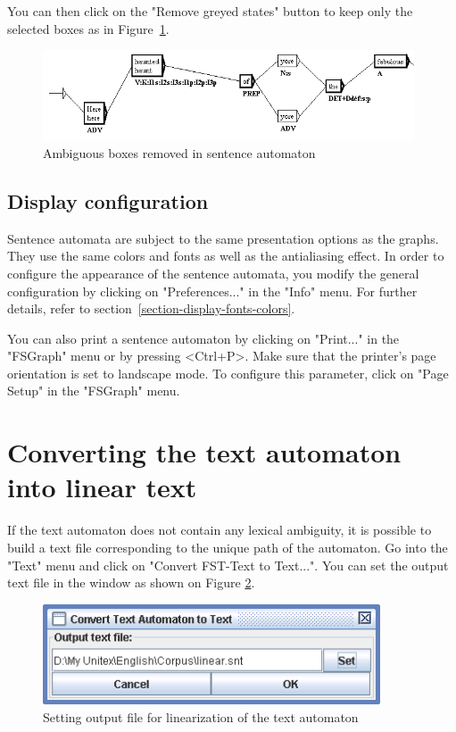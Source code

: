 \bigskip
\noindent You can then click on the "Remove greyed states" button to keep only the selected boxes as in Figure~\ref{fig-removed-ambiguities}.
\begin{figure}[!ht]
\begin{center}
\includegraphics[width=11cm]{resources/img/fig7-24c.png}
\caption{Ambiguous boxes removed in sentence automaton\label{fig-removed-ambiguities}}
\end{center}
\end{figure}

\bigskip
\noindent 
\subsection{Display configuration}
Sentence automata are subject to the same presentation options as the
graphs. They use the same colors and fonts as well as the antialiasing effect. In
order to configure the appearance of the sentence automata, you  modify
the general configuration by clicking on "Preferences..." in the "Info" menu.
For further details, refer to section~\ref{section-display-fonts-colors}.

\bigskip
\noindent You can also print a sentence automaton by clicking on "Print..." in
the "FSGraph" menu or by pressing  <Ctrl+P>. Make sure that the printer's page
orientation is set to landscape mode.  To
configure this parameter, click on "Page Setup" in the
"FSGraph" menu.

\section{Converting the text automaton into linear text}
\label{section-linear-text}
If the text automaton does not contain any lexical ambiguity, it is possible to
build a text file corresponding to the unique path of the automaton. Go into the
"Text" menu and click on "Convert FST-Text to Text...". You can set the output
text file in the window as shown on Figure
\ref{fig-linearization-configuration}.

\begin{figure}[!ht]
\begin{center}
\includegraphics[width=10cm]{resources/img/fig7-25.png}
\caption{Setting output file for linearization of the text automaton\label{fig-linearization-configuration}}
\end{center}
\end{figure}

